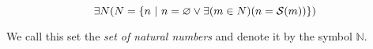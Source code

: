 \begin{axiom}[Infinity]
    \vspace{-\abovedisplayskip}
    \[
        \exists N \pn*{N = \set*{n \suchthat n = \emptyset \join \exists\pn*{m \in N}\pn*{n = \successor{m}}}}
    \]

    We call this set the \emph{set of natural numbers} and denote it by the symbol \(\mathbb{N}\).
\end{axiom}


